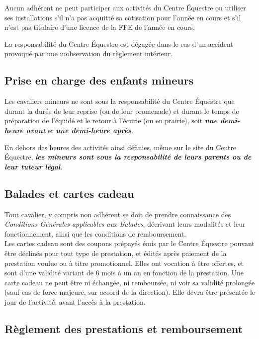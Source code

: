 \documentclass[11pt,a4paper]{article}
\begin{document}
Aucun adhérent ne peut participer aux activités du Centre Équestre ou utiliser ses installations s'il n'a pas acquitté sa cotisation pour l'année en cours et s'il n'est pas titulaire d'une licence de la FFE de l'année en cours.

La responsabilité du Centre Équestre est dégagée dans le cas d'un accident provoqué par une inobservation du règlement intérieur.

\subsection{Prise en charge des enfants mineurs}
Les cavaliers mineurs ne sont sous la responsabilité du Centre Équestre que durant la durée de leur reprise (ou de leur promenade) et durant le temps de préparation de l'équidé et le retour à l'écurie (ou en prairie), soit \textit{\textbf{une demi-heure avant}} et \textit{\textbf{une demi-heure après}}.

En dehors des heures des activités ainsi définies, même sur le site du Centre Équestre, \textit{\textbf{les mineurs sont sous la responsabilité de leurs parents ou de leur tuteur légal}}.

\subsection{Balades et cartes cadeau}

Tout cavalier, y compris non adhérent se doit de prendre connaissance des \textit{Conditions Générales applicables aux Balades}, décrivant leurs modalités et leur fonctionnement, ainsi que les conditions de remboursement.
\\

Les \og cartes cadeau \fg{} sont des coupons prépayés émis par le Centre Équestre pouvant être déclinés pour tout type de prestation, et édités après paiement de la prestation voulue ou à titre promotionnel.
Elles ont vocation à être offertes, et sont d'une validité variant de 6 mois à un an en fonction de la prestation.
Une carte cadeau ne peut être ni échangée, ni remboursée, ni voir sa validité prolongée (sauf cas de force majeure, sur accord de la direction).
Elle devra être présentée le jour de l'activité,  avant l'accès à la prestation.

\subsection{Règlement des prestations et remboursement}
\end{document}
